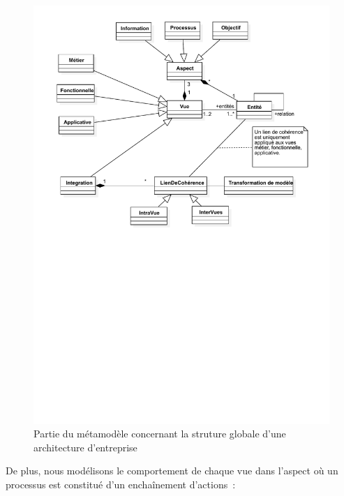 \begin{figure}[!ht]
    \begin{center}
    \includegraphics[trim= 0cm 14cm 0cm 0cm, width=1\textwidth]{figures/4_demarche/ea3m.pdf}
    \end{center}
    \caption{Partie du métamodèle concernant la struture globale d'une architecture d'entreprise} \label{fig:ea3m}
\end{figure}


De plus, nous modélisons le comportement de chaque vue dans l'aspect
 où un processus est constitué d'un enchaînement d'actions~:

